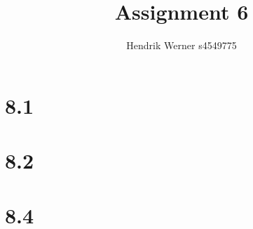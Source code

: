 \documentclass[12pt]{article}
\title{Assignment 6}
\author{Hendrik Werner s4549775}
\begin{document}
\maketitle

\section*{8.1}
\section*{8.2}
\section*{8.4}
\end{document}

